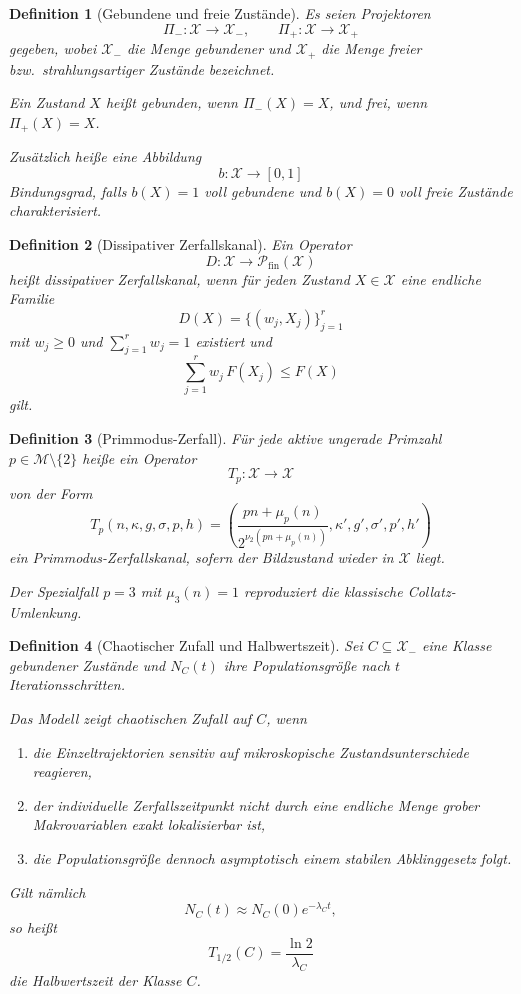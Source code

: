 \documentclass[11pt,a4paper]{article}
\newtheorem{definition}{Definition}
\theoremstyle{definition}
\begin{document}
\begin{definition}[Gebundene und freie Zustände]
	Es seien Projektoren
	\[
	\Pi_-:\mathcal{X}\to\mathcal{X}_-,\qquad
	\Pi_+:\mathcal{X}\to\mathcal{X}_+
	\]
	gegeben, wobei $\mathcal{X}_-$ die Menge gebundener und $\mathcal{X}_+$ die Menge freier bzw.\ strahlungsartiger Zustände bezeichnet.
	
	Ein Zustand $X$ heißt gebunden, wenn $\Pi_-(X)=X$, und frei, wenn $\Pi_+(X)=X$.
	
	Zusätzlich heiße eine Abbildung
	\[
	b:\mathcal{X}\to[0,1]
	\]
	Bindungsgrad, falls $b(X)=1$ voll gebundene und $b(X)=0$ voll freie Zustände charakterisiert.
\end{definition}

\begin{definition}[Dissipativer Zerfallskanal]
	Ein Operator
	\[
	D:\mathcal{X}\to \mathcal{P}_{\mathrm{fin}}(\mathcal{X})
	\]
	heißt dissipativer Zerfallskanal, wenn für jeden Zustand $X\in\mathcal{X}$ eine endliche Familie
	\[
	D(X)=\{(w_j,X_j)\}_{j=1}^r
	\]
	mit $w_j\ge 0$ und $\sum_{j=1}^r w_j=1$ existiert und
	\[
	\sum_{j=1}^r w_j\,F(X_j)\le F(X)
	\]
	gilt.
\end{definition}

\begin{definition}[Primmodus-Zerfall]
	Für jede aktive ungerade Primzahl $p\in\mathcal{M}\setminus\{2\}$ heiße ein Operator
	\[
	T_p:\mathcal{X}\to\mathcal{X}
	\]
	von der Form
	\[
	T_p(n,\kappa,g,\sigma,p,h)
	=
	\left(
	\frac{pn+\mu_p(n)}{2^{\nu_2(pn+\mu_p(n))}},
	\kappa',g',\sigma',p',h'
	\right)
	\]
	ein Primmodus-Zerfallskanal, sofern der Bildzustand wieder in $\mathcal{X}$ liegt.
	
	Der Spezialfall $p=3$ mit $\mu_3(n)=1$ reproduziert die klassische Collatz-Umlenkung.
\end{definition}

\begin{definition}[Chaotischer Zufall und Halbwertszeit]
	Sei $C\subseteq\mathcal{X}_-$ eine Klasse gebundener Zustände und $N_C(t)$ ihre Populationsgröße nach $t$ Iterationsschritten.
	
	Das Modell zeigt chaotischen Zufall auf $C$, wenn
	\begin{enumerate}
		\item die Einzeltrajektorien sensitiv auf mikroskopische Zustandsunterschiede reagieren,
		\item der individuelle Zerfallszeitpunkt nicht durch eine endliche Menge grober Makrovariablen exakt lokalisierbar ist,
		\item die Populationsgröße dennoch asymptotisch einem stabilen Abklinggesetz folgt.
	\end{enumerate}
	
	Gilt nämlich
	\[
	N_C(t)\approx N_C(0)e^{-\lambda_C t},
	\]
	so heißt
	\[
	T_{1/2}(C)=\frac{\ln 2}{\lambda_C}
	\]
	die Halbwertszeit der Klasse $C$.
\end{definition}
\end{document}
